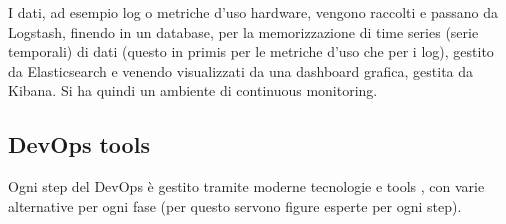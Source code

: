 I dati, ad esempio log o metriche d’uso hardware, vengono raccolti e passano da Logstash, finendo in un database, per la memorizzazione di time series (serie temporali) di dati (questo in primis per le metriche d’uso che per i log), gestito da Elasticsearch e venendo visualizzati da una dashboard grafica, gestita da Kibana. Si ha quindi un ambiente di continuous monitoring.
\subsection{DevOps tools}
Ogni step del DevOps è gestito tramite moderne tecnologie e tools , con varie alternative per ogni fase (per questo servono figure esperte per ogni step).
